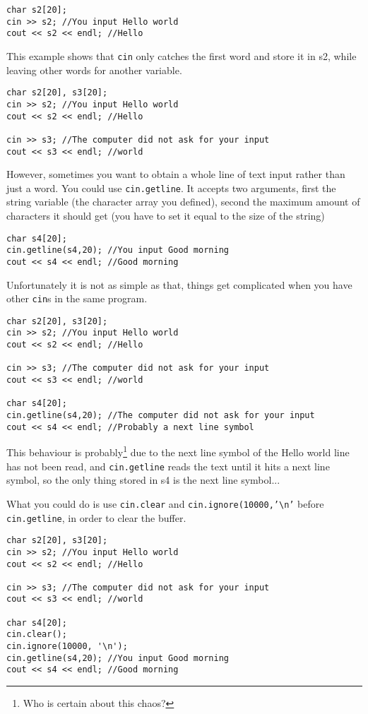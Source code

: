 \begin{lstlisting}
char s2[20];
cin >> s2; //You input Hello world
cout << s2 << endl; //Hello
\end{lstlisting}

This example shows that \texttt{cin} only catches the first word and store it in s2, while leaving other words for another variable.

\begin{lstlisting}
char s2[20], s3[20];
cin >> s2; //You input Hello world
cout << s2 << endl; //Hello

cin >> s3; //The computer did not ask for your input
cout << s3 << endl; //world
\end{lstlisting}

However, sometimes you want to obtain a whole line of text input rather than just a word. You could use \texttt{cin.getline}. It accepts two arguments, first the string variable (the character array you defined), second the maximum amount of characters it should get (you have to set it equal to the size of the string)

\begin{lstlisting}
char s4[20];
cin.getline(s4,20); //You input Good morning
cout << s4 << endl; //Good morning
\end{lstlisting}

Unfortunately it is not as simple as that, things get complicated when you have other \texttt{cin}s in the same program.

\begin{lstlisting}
char s2[20], s3[20];
cin >> s2; //You input Hello world
cout << s2 << endl; //Hello

cin >> s3; //The computer did not ask for your input
cout << s3 << endl; //world

char s4[20];
cin.getline(s4,20); //The computer did not ask for your input
cout << s4 << endl; //Probably a next line symbol
\end{lstlisting}

This behaviour is probably\footnote{Who is certain about this chaos?} due to the next line symbol of the Hello world line has not been read, and \texttt{cin.getline} reads the text until it hits a next line symbol, so the only thing stored in s4 is the next line symbol...

What you could do is use \texttt{cin.clear} and \texttt{cin.ignore(10000,'\textbackslash n'} before \texttt{cin.getline}, in order to clear the buffer.

\begin{lstlisting}
char s2[20], s3[20];
cin >> s2; //You input Hello world
cout << s2 << endl; //Hello

cin >> s3; //The computer did not ask for your input
cout << s3 << endl; //world

char s4[20];
cin.clear();
cin.ignore(10000, '\n');
cin.getline(s4,20); //You input Good morning
cout << s4 << endl; //Good morning
\end{lstlisting}

